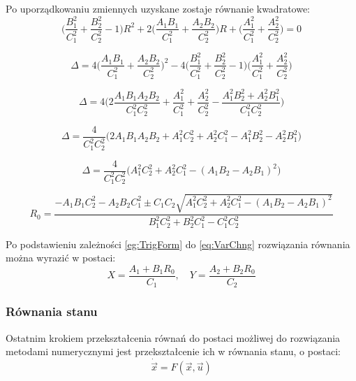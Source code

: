 \documentclass[10pt]{article}
\begin{document}
Po uporządkowaniu zmiennych uzyskane zostaje równanie kwadratowe:
\begin{equation}
\Bigg( \frac{B_1^2}{C_1^2} + \frac{B_2^2}{C_2^2} - 1 \Bigg) R^2 +
2 \Bigg( \frac{A_1B_1}{C_1^2} + \frac{A_2B_2}{C_2^2} \Bigg) R +
\Bigg( \frac{A_1^2}{C_1^2} + \frac{A_2^2}{C_2^2} \Bigg) = 0
\end{equation}

\begin{equation}
\Delta = 4 \Bigg( \frac{A_1B_1}{C_1^2} + \frac{A_2B_2}{C_2^2} \Bigg)^2 -
4 \Bigg( \frac{B_1^2}{C_1^2} + \frac{B_2^2}{C_2^2} - 1 \Bigg)
\Bigg( \frac{A_1^2}{C_1^2} + \frac{A_2^2}{C_2^2} \Bigg)
\end{equation}

\begin{equation}
\Delta = 4 \Bigg(2
\frac{A_1 B_1 A_2 B_2}{C_1^2 C_2^2} +
\frac{A_1^2}{C_1^2} +
\frac{A_2^2}{C_2^2} -
\frac{A_1^2 B_2^2 + A_2^2 B_1^2}{C_1^2 C_2^2} 
\Bigg)
\end{equation}

\begin{equation}
\Delta = \frac{4}{C_1^2C_2^2}
\Big( 2A_1B_1A_2B_2 + A_1^2C_2^2 + A_2^2C_1^2 - A_1^2B_2^2 - A_2^2B_1^2 \Big)
\end{equation}

\begin{equation}
\Delta = \frac{4}{C_1^2C_2^2}
\Big( A_1^2C_2^2 + A_2^2C_1^2 - ( A_1B_2 - A_2B_1)^2 \Big)
\end{equation}

\begin{equation}
R_0 = \frac{-A_1B_1C_2^2 -A_2B_2C_1^2 \pm
C_1C_2\sqrt{A_1^2C_2^2 + A_2^2C_1^2 - ( A_1B_2 - A_2B_1)^2}}
{B_1^2C_2^2 + B_2^2C_1^2 - C_1^2C_2^2}
\end{equation}

Po podstawieniu zależności \eqref{eg:TrigForm} do \eqref{eq:VarChng} rozwiązania równania można wyrazić w postaci:
\begin{equation}
X = \frac{A_1 + B_1 R_0}{C_1}, \quad
Y = \frac{A_2 + B_2 R_0}{C_2}
\end{equation}
 
\newpage
\subsubsection*{Równania stanu}
Ostatnim krokiem przekształcenia równań do postaci możliwej do rozwiązania metodami numerycznymi jest przekształcenie ich w równania stanu, o postaci:
\begin{equation}
\dot{\vec{x}} = F(\vec{x}, \vec{u})
\end{equation}
\end{document}
